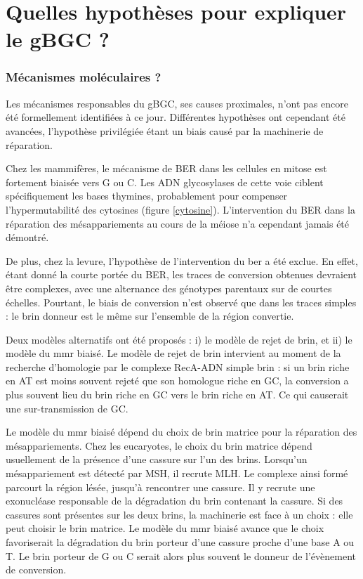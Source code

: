 \documentclass[11pt, oneside]{scrartcl}
\begin{document}
\section{Quelles hypothèses pour expliquer le gBGC ?}
\label{sec:orgheadline11}
\subsubsection*{Mécanismes moléculaires ?}
\label{sec:orgheadline9}

Les mécanismes responsables du gBGC, ses causes proximales, n'ont pas encore été
formellement identifiées à ce jour. Différentes hypothèses ont cependant été
avancées, l'hypothèse privilégiée étant un biais causé par la machinerie de
réparation. 

Chez les mammifères, le mécanisme de BER dans les cellules en mitose est
fortement biaisée vers G ou C. Les ADN glycosylases de cette voie ciblent
spécifiquement les bases thymines, probablement pour compenser l'hypermutabilité
des cytosines\cite{brown_specific_1987} (figure \ref{cytosine}). L'intervention
du BER dans la réparation des mésappariements au cours de la méiose n'a
cependant jamais été démontré. 

De plus, chez la levure, l'hypothèse de l'intervention du \ac{ber} a été
exclue\cite{lesecque_gc-biased_2013}. En effet, étant donné la courte portée du
BER, les traces de conversion obtenues devraient être complexes, avec une
alternance des génotypes parentaux sur de courtes échelles. Pourtant, le biais
de conversion n'est observé que dans les traces simples : le brin donneur est le
même sur l'ensemble de la région convertie.

Deux modèles alternatifs ont été proposés\cite{lesecque_gc-biased_2013} : i) le
modèle de rejet de brin, et ii) le modèle du \ac{mmr} biaisé. Le modèle de rejet
de brin intervient au moment de la recherche d'homologie par le complexe
RecA-ADN simple brin : si un brin riche en AT est moins souvent rejeté que son
homologue riche en GC, la conversion a plus souvent lieu du brin riche en GC
vers le brin riche en AT. Ce qui causerait une sur-transmission de GC. 

Le modèle du \ac{mmr} biaisé dépend du choix de brin matrice pour la réparation
des mésappariements. Chez les eucaryotes, le choix du brin matrice dépend
usuellement de la présence d'une cassure sur l'un des brins. Lorsqu'un
mésappariement est détecté par MSH, il recrute MLH. Le complexe ainsi formé
parcourt la région lésée, jusqu'à rencontrer une cassure. Il y recrute une
exonucléase responsable de la dégradation du brin contenant la cassure. Si des
cassures sont présentes sur les deux brins, la machinerie est face à un choix :
elle peut choisir le brin matrice. Le modèle du \ac{mmr} biaisé avance que le
choix favoriserait la dégradation du brin porteur d'une cassure proche d'une
base A ou T. Le brin porteur de G ou C serait alors plus souvent le donneur de
l'évènement de conversion. 
\end{document}
